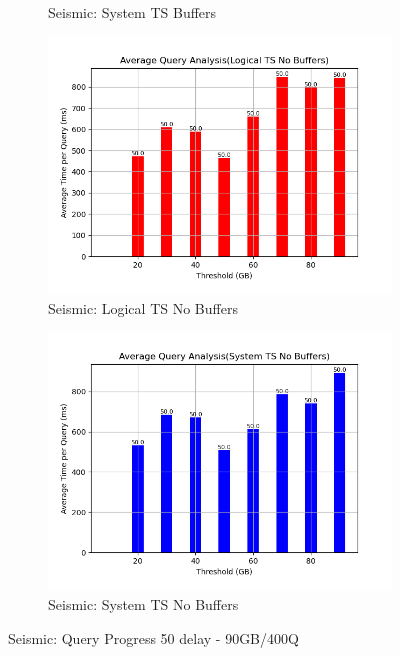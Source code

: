 \begin{figure}
\begin{subfigure}[c]{0.48\textwidth}
		\caption{Seismic: System TS Buffers}
		\label{fig:system-ts-50-seismic}
	\end{subfigure}
	\begin{subfigure}[c]{0.48\textwidth}
		\includegraphics[width=1\textwidth]	 {figures/Experiments/Dynamic/SEISMIC/batch_answering/50/average_query_time_per_batch_version_999777016_10485760_10_delay[50].png}
		\caption{Seismic: Logical TS No Buffers}
		\label{fig:logical-ts-no-50-seismic}
	\end{subfigure}
	\begin{subfigure}[c]{0.48\textwidth}
		\includegraphics[width=1\textwidth]	 {figures/Experiments/Dynamic/SEISMIC/batch_answering/50/average_query_time_per_batch_version_999777017_10485760_10_delay[50].png}
		\caption{Seismic: System TS No Buffers}
		\label{fig:system-ts-no-50-seismic}
	\end{subfigure}
	\caption{Seismic: Query Progress 50 delay - 90GB/400Q}
	\label{fig:query-progress-50-seismic}
\end{figure}

